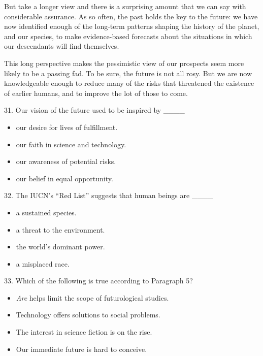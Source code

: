 \documentclass[UTF8,11pt]{ctexart}
\begin{document}
But take a longer view and there is a surprising amount that we can say with considerable assurance. As so often, the past holds the key to the future: we have now identified enough of the long-term patterns shaping the history of the planet, and our species, to make evidence-based forecasts about the situations in which our descendants will find themselves.


This long perspective makes the pessimistic view of our prospects seem more likely to be a passing fad. To be sure, the future is not all rosy. But we are now knowledgeable enough to reduce many of the risks that threatened the existence of earlier humans, and to improve the lot of those to come.


31. Our vision of the future used to be inspired by \_\_\_\_


\begin{itemize}[leftmargin=2em,itemsep=.2em,topsep=.4em]\item[A.] our desire for lives of fulfillment.
\item[B.] our faith in science and technology.
\item[C.] our awareness of potential risks.
\item[D.] our belief in equal opportunity.
\end{itemize}

32. The IUCN’s “Red List” suggests that human beings are \_\_\_\_


\begin{itemize}[leftmargin=2em,itemsep=.2em,topsep=.4em]\item[A.] a sustained species.
\item[B.] a threat to the environment.
\item[C.] the world’s dominant power.
\item[D.] a misplaced race.
\end{itemize}

33. Which of the following is true according to Paragraph 5?


\begin{itemize}[leftmargin=2em,itemsep=.2em,topsep=.4em]\item[A.] \textit{Arc} helps limit the scope of futurological studies.
\item[B.] Technology offers solutions to social problems.
\item[C.] The interest in science fiction is on the rise.
\item[D.] Our immediate future is hard to conceive.
\end{itemize}
\end{document}
